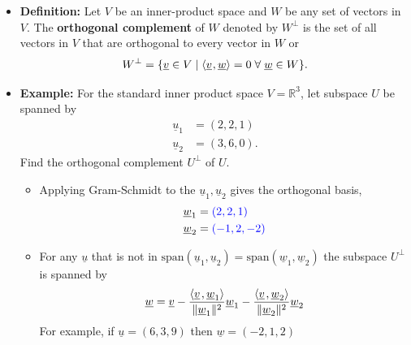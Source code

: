 \documentclass[11pt,twoside]{report}
\newcommand{\bbR}{{\mathbb{R}}}
\newcommand{\vecnot}{\underline}
\newcommand{\Span}{\mathrm{span}}
\newcommand{\inner}[2]{{\left\langle #1 \mskip2mu , #2 \right\rangle}}
\newcommand{\tinner}[2]{{\langle #1 \mskip1mu , #2 \rangle}}
\begin{document}
\begin{itemize}
\begin{itemize}
\item It is easily verified that $\{ \vecnot{w}_1, \vecnot{w}_2, \vecnot{w}_3\}$ is an orthogonal set of vectors.

\end{itemize} 


\item \textbf{Definition:} 
Let $V$ be an inner-product space and $W$ be any set of vectors in $V$. The \textbf{orthogonal complement} of $W$ denoted by $W^{\bot}$ is the set of all vectors in $V$ that are orthogonal to every vector in $W$ or
\begin{equation*}
W^{\bot} = \left\{ \vecnot{v} \in V \mid  \tinner{ \vecnot{v} }{ \vecnot{w} } = 0 \; \forall \; \vecnot{w}\in W \right\}. 
\end{equation*}



\item \textbf{Example:} 
For the standard inner product space $V = \bbR^3$, let subspace $U$ be spanned by
\begin{align*}
\vecnot{u}_1 &= (2,2,1) \\
\vecnot{u}_2 &= (3,6,0).
\end{align*}
Find the orthogonal complement $U^\perp$ of $U$. 
\begin{itemize}
\item Applying Gram-Schmidt to the $\vecnot{u}_1, \vecnot{u}_2$ gives the orthogonal basis, 
\begin{align*}
\vecnot{w}_1 &= \textcolor{blue}{(2,2,1)} \\
\vecnot{w}_2 & = \textcolor{blue}{(-1,2,-2)} 
\end{align*}
\item For any $\vecnot{u}$ that is not in $\Span(\vecnot{u}_1, \vecnot{u}_2) =\Span( \vecnot{w}_1, \vecnot{w}_2)$ the subspace $U^\perp$ is spanned by 
\begin{align*}
\vecnot{w} =\vecnot{v} - \frac{ \inner{\vecnot{v}  }{ \vecnot{w}_1 } }{ \|\vecnot{w}_1\|^2 } \vecnot{w}_1 -  \frac{ \inner{\vecnot{v}  }{ \vecnot{w}_2 } }{ \|\vecnot{w}_2\|^2 } \vecnot{w}_2
\end{align*}
For example, if $\vecnot{u}  = (6,3,9)$ then  $\vecnot{w} = (-2,1,2)$
\end{itemize}

\end{itemize}
\end{document}
